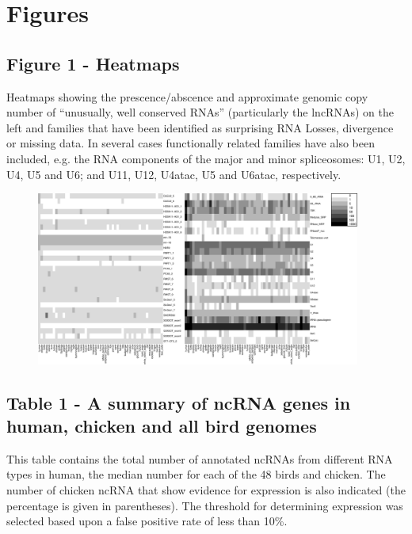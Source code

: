 \documentclass[10pt]{bmc_article}
\newenvironment{bmcformat}{\begin{raggedright}\baselineskip20pt\sloppy\setboolean{publ}{false}}{\end{raggedright}\baselineskip20pt\sloppy}
\begin{document}
\begin{bmcformat}
{
  } %


\clearpage
\newpage

\section*{Figures}
  \subsection*{Figure 1 - Heatmaps}

Heatmaps showing the prescence/abscence and approximate genomic copy
number of ``unusually, well conserved RNAs'' (particularly the
lncRNAs) on the left and families that have been identified as
surprising RNA Losses, divergence or missing data. In several cases
functionally related families have also been included, e.g. the RNA
components of the major and minor spliceosomes: U1, U2, U4, U5 and U6;
and U11, U12, U4atac, U5 and U6atac, respectively.\label{fig:1}

 \begin{figure}[ht]
   \centering
   \includegraphics[width=0.95\textwidth]{figures/figure1.pdf}
 \end{figure}


\clearpage
\newpage

  \subsection*{Table 1 - A summary of ncRNA genes in human, chicken and all bird genomes}

This table contains the total number of annotated ncRNAs from
different RNA types in human, the median number for each of the 48
birds and chicken. The number of chicken ncRNA that show evidence for
expression is also indicated (the percentage is given in parentheses).
The threshold for determining expression was selected based upon a
false positive rate of less than 10\%.\label{table:1}


\end{bmcformat}
\end{document}
